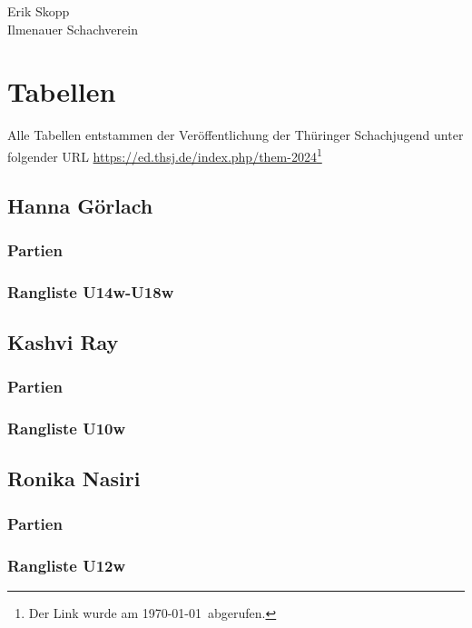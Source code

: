 \documentclass[a4paper,ngerman]{tui-algo-seminar}
\begin{document}
\vspace{2cm}
Erik Skopp\\
Ilmenauer Schachverein\\
\clearpage


\section{Tabellen}
Alle Tabellen entstammen der Veröffentlichung der Thüringer Schachjugend unter folgender URL \url{https://ed.thsj.de/index.php/them-2024}\footnote{Der Link wurde am \today ~abgerufen.}

\subsection{Hanna Görlach}
    \subsubsection{Partien}
        
    \subsubsection{Rangliste U14w-U18w}
        
\clearpage

\subsection{Kashvi Ray}
    \subsubsection{Partien}
        
    \subsubsection{Rangliste U10w}
        
\clearpage

\subsection{Ronika Nasiri}
    \subsubsection{Partien}
        
    \subsubsection{Rangliste U12w}
        
    
\end{document}
